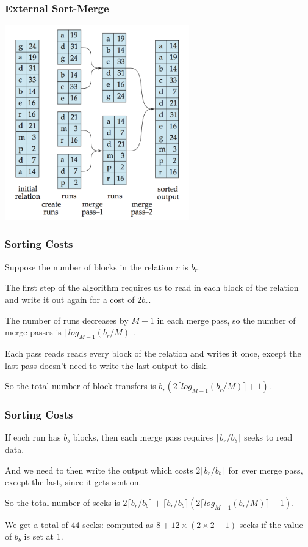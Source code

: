 \begin{frame}
\frametitle{External Sort-Merge}

\begin{center}
	\includegraphics[width=0.6\textwidth]{images/external-merge}
\end{center}

\end{frame}

\begin{frame}
\frametitle{Sorting Costs}

Suppose the number of blocks in the relation $r$ is $b_{r}$.


The first step of the algorithm requires us to read in each block of the relation and write it out again for a cost of $2b_{r}$. 

The number of runs decreases by $M-1$ in each merge pass, so the number of merge passes is $\lceil log_{M-1}(b_{r}/M)\rceil$. 

Each pass reads reads every block of the relation and writes it once, except the last pass doesn't need to write the last output to disk. 

So the total number of block transfers is $b_{r}(2\lceil log_{M-1}(b_{r}/M)\rceil + 1)$. 

\end{frame}

\begin{frame}
\frametitle{Sorting Costs}

If each run has $b_{b}$ blocks, then each merge pass requires $\lceil b_{r}/b_{b}\rceil$ seeks to read data. 

And we need to then write the output which costs  $2\lceil b_{r}/b_{b}\rceil$ for ever merge pass, except the last, since it gets sent on. 

So the total number of seeks is $2\lceil b_{r}/b_{b}\rceil + \lceil b_{r}/b_{b}\rceil(2 \lceil log_{M-1}(b_{r}/M)\rceil - 1)$.


We get a total of 44 seeks: computed as $8 + 12 \times (2 \times 2 - 1)$ seeks if the value of $b_{b}$ is set at 1.

\end{frame}


